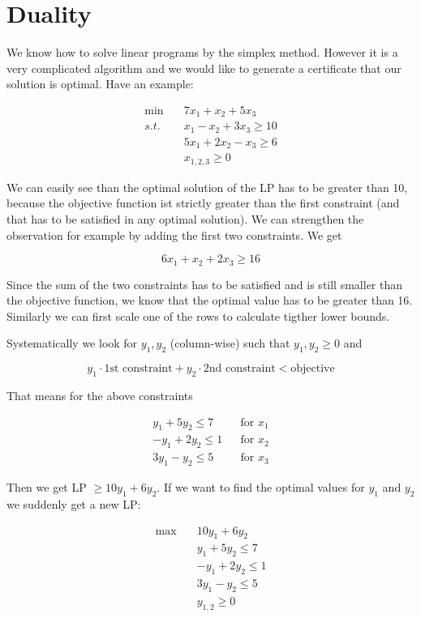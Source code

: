 \section{Duality}

We know how to solve linear programs by the simplex method. However it is a very complicated algorithm and we would like to generate a certificate that our solution is optimal. Have an example:

\begin{align*}
\min \quad & 7x_1+x_2+5x_3\\
s.t.\quad & x_1 -x_2 +3x_3 \geq 10\\
& 5x_1+2x_2-x_3 \geq 6\\
&x_{1,2,3} \geq 0
\end{align*}

We can easily see than the optimal solution of the LP has to be greater than 10, because the objective function ist strictly greater than the first constraint (and that has to be satisfied in any optimal solution). We can strengthen the observation for example by adding the first two constraints. We get

\[6x_1+x_2+2x_3\geq 16\]

Since the sum of the two constraints has to be satisfied and is still smaller than the objective function, we know that the optimal value has to be greater than 16. Similarly we can first scale one of the rows to calculate tigther lower bounds. 

Systematically we look for $y_1,y_2$ (column-wise) such that $y_1,y_2\geq 0$ and

\[y_1 \cdot \text{1st constraint} + y_2 \cdot \text{2nd constraint} < \text{objective}\]

That means for the above constraints

\begin{align*}
y_1+5y_2 \leq 7 &&\text{for }x_1\\
-y_1 +2y_2 \leq 1 &&\text{for }x_2\\
3y_1 - y_2 \leq 5 &&\text{for }x_3
\end{align*}

Then we get LP $\geq 10y_1 + 6y_2$. If we want to find the optimal values for $y_1$ and $y_2$ we suddenly get a new LP:

\begin{align*}
\max \quad & 10y_1 +6y_2\\
&y_1 + 5y_2 \leq 7\\
&-y_1+2y_2 \leq 1\\
&3y_1 -y_2 \leq 5\\
&y_{1,2} \geq 0
\end{align*}

